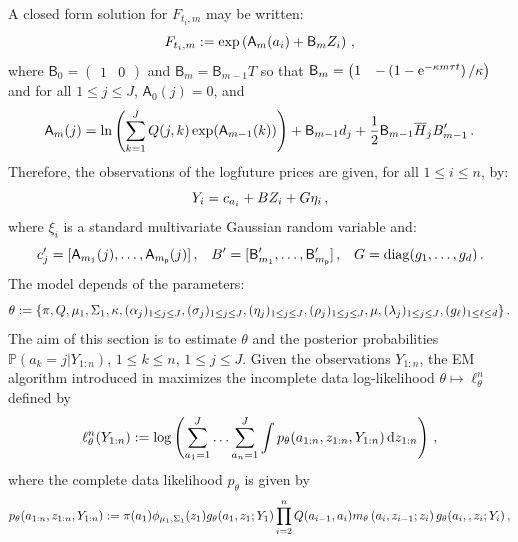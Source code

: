 A closed form solution for $F_{t_i,m}$  may be written:
\[
F_{t_i,m} := \exp\left( \mathsf{A}_{m}(a_{i}) + \mathsf{B}_{m} Z_{i}\right)\,,
\]
where $\mathsf{B}_0	= \begin{pmatrix}1 & 0 \end{pmatrix}$ and  $\mathsf{B}_m    = \mathsf{B}_{m-1} T$ so that  $ \mathsf{B}_m= \begin{pmatrix} 1 & -\left(1-\mathrm{e}^{-\kappa m \tau t}\right)/\kappa \end{pmatrix}$ and
for all $1\le j\le J$, $\mathsf{A}_0(j) = 0$,  and
\begin{equation*}
\mathsf{A}_m(j) = \ln \left(\sum^J_{k=1} Q(j,k) \exp(\mathsf{A}_{m-1}(k)) \right) + \mathsf{B}_{m-1} d_j + \frac{1}{2} \mathsf{B}_{m-1} \overline{H}_j B'_{m-1}\,.
\end{equation*}
Therefore, the observations of the  logfuture prices are given, for all $1\le i\le n$, by:
\[
Y_i = c_{a_i} + B Z_i + G \eta_i\,,
\]
where $\xi_i$ is a standard multivariate Gaussian random variable and:
\[
c_{j}' = [ \mathsf{A}_{m_1}(j), \dots, \mathsf{A}_{m_{\mathsf{p}}}(j) ]\,,
\;\;\;
B' = [\mathsf{B}_{m_1}',  \dots, \mathsf{B}_{m_{\mathsf{p}}}']\,, \;\;\;
G = \mathrm{diag}(g_1, \dots , g_{d} )\,.
\]
The model depends of the parameters:
\[
\theta := \{\pi, Q, \mu_1, \Sigma_1, \kappa, (\alpha_j)_{1\leq j\leq J}, (\sigma_j)_{1\leq j\leq J}, (\eta_j)_{1\leq j\leq J}, (\rho_j)_{1\leq j\leq J}, \mu, (\lambda_j)_{1\leq j\leq J}, (g_{\ell})_{1\leq \ell\leq d} \}\, .
\]
The aim of this section is to estimate $\theta$ and the posterior probabilities $\mathbb{P}(a_k=j|Y_{1:n})$, $1\le k \le n$, $1\le j \le J$. Given the observations $Y_{1:n}$, the EM algorithm introduced in \cite{dempster:laird:rubin:1977} maximizes the incomplete data log-likelihood $\theta\mapsto \ell_{\theta}^{n}$ defined by
\begin{equation*}
\ell_{\theta}^{n}(Y_{1:n}) := \log\left(\sum_{a_1=1}^J\ldots\sum_{a_n=1}^J\int p_{\theta}(a_{1:n},z_{1:n},Y_{1:n})\,\mathrm{d} z_{1:n}\right)\,,
\end{equation*}
where the complete data likelihood $p_{\theta}$ is given by
\begin{equation*}
p_{\theta}(a_{1:n},z_{1:n},Y_{1:n}) := \pi(a_1)\phi_{\mu_1,\Sigma_1}(z_1)g_{\theta}(a_1,z_1;Y_1)\prod^{n}_{i=2}Q(a_{i-1},a_i)m_{\theta}\left(a_{i},z_{i-1};z_i\right)g_{\theta}(a_i,,z_i;Y_i)\,,
\end{equation*}
